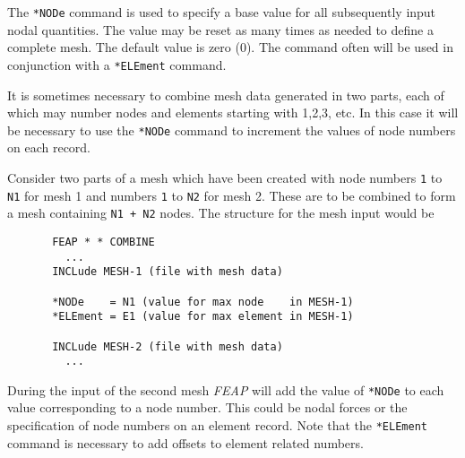 \headb

The \texttt{*NODe} command is used to specify a base value for all
subsequently input nodal quantities.  The value may be reset as many
times as needed to define a complete mesh.  The default value is zero (0).
The command often will be used in conjunction with a \texttt{*ELEment}
command.

It is sometimes necessary to combine mesh data generated in two parts,
each of which may number nodes and elements starting with 1,2,3, etc.
In this case it will be necessary to use the \texttt{*NODe} command
to increment the values of node numbers on each record.

Consider two parts of a mesh which have been created with node
numbers \texttt{1} to \texttt{N1} for mesh 1 and 
numbers \texttt{1} to \texttt{N2} for mesh 2.  These are to be combined
to form a mesh containing \texttt{N1 + N2} nodes.  The structure for
the mesh input would be
\begin{verbatim}
       FEAP * * COMBINE
         ...
       INCLude MESH-1 (file with mesh data)

       *NODe    = N1 (value for max node    in MESH-1) 
       *ELEment = E1 (value for max element in MESH-1) 

       INCLude MESH-2 (file with mesh data)
         ...
\end{verbatim}

During the input of the second mesh \textsl{FEAP} will add the
value of \texttt{*NODe} to each value corresponding to a node number.
This could be nodal forces or the specification of node numbers on an
element record.  Note that the \texttt{*ELEment} command is necessary to
add offsets to element related numbers.
\vfill\eject
